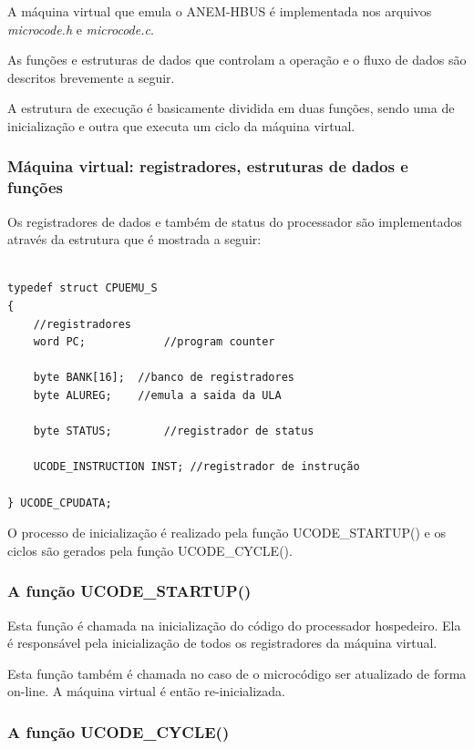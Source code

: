 \documentclass[11pt]{report}
\begin{document}
A máquina virtual que emula o ANEM-HBUS é implementada nos arquivos \textit{microcode.h} e \textit{microcode.c}. 

As funções e estruturas de dados que controlam a operação e o fluxo de dados são descritos brevemente a seguir.

A estrutura de execução é basicamente dividida em duas funções, sendo uma de inicialização e outra que executa um ciclo da máquina virtual.

\subsubsection{Máquina virtual: registradores, estruturas de dados e funções}

Os registradores de dados e também de status do processador são implementados através da estrutura que é mostrada a seguir:

\begin{verbatim}

typedef struct CPUEMU_S
{
	//registradores
	word PC;			//program counter
	
	byte BANK[16];	//banco de registradores
	byte ALUREG; 	//emula a saida da ULA
	
	byte STATUS;		//registrador de status
	
	UCODE_INSTRUCTION INST; //registrador de instrução
	
} UCODE_CPUDATA;

\end{verbatim}

O processo de inicialização é realizado pela função UCODE\_STARTUP() e os ciclos são gerados pela função UCODE\_CYCLE().

\subsubsection{A função UCODE\_STARTUP()}

Esta função é chamada na inicialização do código do processador hospedeiro. Ela é responsável pela inicialização de todos os registradores da máquina virtual.

Esta função também é chamada no caso de o microcódigo ser atualizado de forma on-line. A máquina virtual é então re-inicializada.

\subsubsection{A função UCODE\_CYCLE()}
\end{document}
